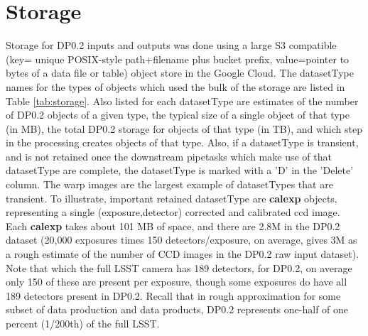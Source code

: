 \documentclass[OPS,authoryear,toc]{lsstdoc}
\begin{document}
\section{Storage}

Storage for DP0.2 inputs and outputs was done using a large S3 compatible
(key= unique POSIX-style path+filename plus bucket prefix, value=pointer
to bytes of a data file or table) object store in the Google Cloud.   
The datasetType names for the types of objects which used the bulk 
of the storage are listed in Table \ref{tab:storage}.  Also listed
for each datasetType are estimates of the number of DP0.2 objects of 
a given type, the typical size of a single object of 
that type (in MB), the total DP0.2 storage for objects of 
that type (in TB), and which step in the processing
creates objects of that type.  Also, if a datasetType is transient, and 
is not retained once the downstream pipetasks which make use of that
datasetType are complete, the datasetType is marked with a 'D' in the 'Delete'
column.  The warp images are the largest example of datasetTypes that are
transient.
To illustrate, important retained datasetType are {\bf calexp} objects, 
representing a single (exposure,detector) corrected and 
calibrated ccd image.
Each {\bf calexp} takes about 101 MB of space, and there are 2.8M 
in the DP0.2 dataset (20,000 exposures times 150 detectors/exposure, on average, gives 3M as a rough estimate of the number of CCD images in the DP0.2 raw
input dataset).  Note that which the full LSST camera has 189 
detectors, for DP0.2, on average only 150 of these are present per exposure,
though some exposures do have all 189 detectors present in DP0.2.
Recall that in rough approximation for some subset of data production
and data products,  DP0.2 represents one-half of one percent 
(1/200th) of the full LSST.
\end{document}
